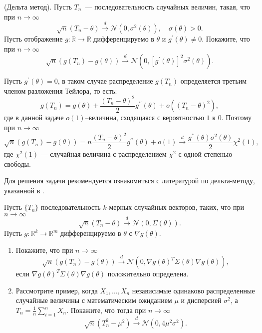 \begin{problem}(Дельта метод). 
Пусть $T_n$~--- последовательность случайных величин, такая, что  при $n\to\infty$
$$\sqrt{n}(T_n-\theta)\xrightarrow{d}\mathcal{N}(0,\sigma^2(\theta)),\quad \sigma(\theta)>0.$$
Пусть отображение $g:\mathbb{R}\to\mathbb{R}$ дифференцируемо в $\theta$ и $g^{\prime}(\theta)\not=0$. Покажите, что при $n\to\infty$
$$
\sqrt{n}\left(g(T_n)-g(\theta)\right)\xrightarrow{d} \mathcal{N}(0,[g^{\prime}(\theta)]^2\sigma^2(\theta)).
$$
\end{problem}
\begin{remark} 
Пусть  $g^{\prime}(\theta) = 0$, в таком случае распределение $g(T_n)$ определяется третьим членом разложения Тейлора, то есть:
$$
g(T_n) = g(\theta) + \frac{(T_n-\theta)^2}{2}g^{\prime\prime}(\theta)+o\left((T_n-\theta)^2\right),
$$ 
где в данной задаче $o(1)$--величина, сходящаяся с вероятностью $1$ к $0$. Поэтому при $n\to\infty$
$$
\sqrt{n}(g(T_n) -g(\theta)) = n\frac{(T_n-\theta)^2}{2}g^{\prime\prime}(\theta)+o(1)\xrightarrow{d} \frac{g^{\prime\prime}(\theta)\sigma^2(\theta)}{2}\chi^2(1),
$$
где $\chi^2(1)$ --- случайная величина с распределением $\chi^2$ с одной степенью свободы.

Для решения задачи рекомендуется ознакомиться с литературой по дельта-методу, указанной в \cite{Gupta}.
\end{remark}

\begin{problem}
Пусть $\{T_n\}$ последовательность $k$-мерных случайных векторов, таких, что при $n\to\infty$ 
$$\sqrt{n}(T_n-\theta)\xrightarrow{d}\mathcal{N}(0,\Sigma(\theta)).$$ 
Пусть $g:\mathbb{R}^{k}\to \mathbb{R}^m$ дифференцируемо в $\theta$ с $\nabla g(\theta)$. 
\begin{enumerate}
\item

Покажите, что при $n\to\infty$
$$
\sqrt{n}\left(g(T_n)-g(\theta)\right)\xrightarrow{d} \mathcal{N}(0,\nabla g(\theta)^{T}\Sigma(\theta)\nabla g(\theta)),
$$
если $\nabla g(\theta)^{T}\Sigma(\theta)\nabla g(\theta)$ положительно определена.
\item
Рассмотрите пример, когда   $X_1,\dots,X_n$ независимые одинаково распределенные случайные величины с математическим ожиданием $\mu$ и дисперсией $\sigma^2$, а $T_n = \frac{1}{n}\sum_{i=1}^n X_n$. Покажите, что тогда при $n\to\infty$ 
$$
\sqrt{n}(T_n^2-\mu^2)\xrightarrow{d}\mathcal{N}(0,4\mu^2\sigma^2).
$$
\end{enumerate}
\end{problem}

